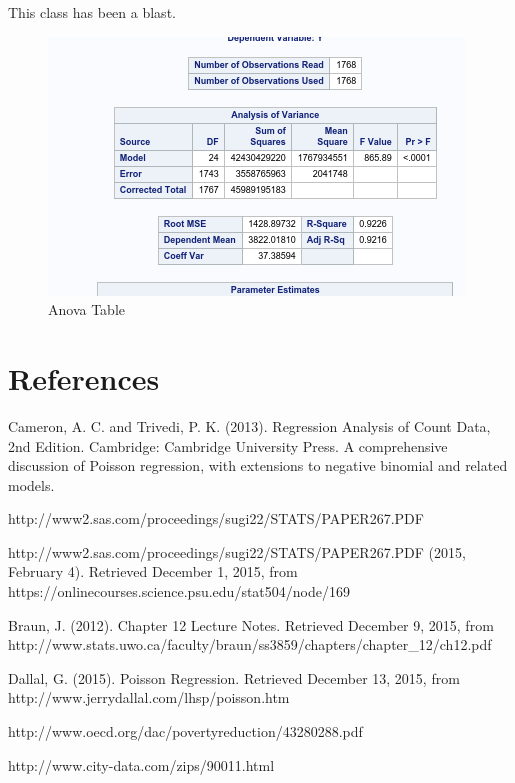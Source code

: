 This class has been a blast. 

\begin{figure}
\centering
\includegraphics{Chapters/anova.png}
\caption{Anova Table}
\label{fig:my_label}
\end{figure}
\newpage

\section{References}

Cameron, A. C. and Trivedi, P. K. (2013). Regression Analysis of Count Data, 2nd Edition. Cambridge: Cambridge University Press. A comprehensive discussion of Poisson regression, with extensions to negative binomial and related models.

http://www2.sas.com/proceedings/sugi22/STATS/PAPER267.PDF

http://www2.sas.com/proceedings/sugi22/STATS/PAPER267.PDF
(2015, February 4). Retrieved December 1, 2015, from https://onlinecourses.science.psu.edu/stat504/node/169

Braun, J. (2012). Chapter 12 Lecture Notes. Retrieved December 9, 2015, from http://www.stats.uwo.ca/faculty/braun/ss3859/chapters/chapter_12/ch12.pdf

Dallal, G. (2015). Poisson Regression. Retrieved December 13, 2015, from http://www.jerrydallal.com/lhsp/poisson.htm

http://www.oecd.org/dac/povertyreduction/43280288.pdf

http://www.city-data.com/zips/90011.html
